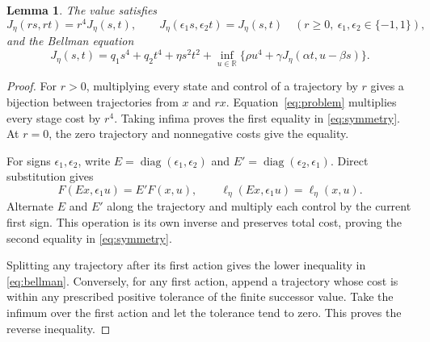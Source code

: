 \documentclass[10pt]{article}
\newtheorem{lemma}{Lemma}
\newcommand{\R}{\mathbb R}
\begin{document}
\begin{lemma}
\label{lem:symmetry}
The value satisfies
\begin{equation}
 J_\eta(rs,rt)=r^4J_\eta(s,t),\qquad
 J_\eta(\epsilon_1s,\epsilon_2t)=J_\eta(s,t)
 \quad(r\geq0,\ \epsilon_1,\epsilon_2\in\{-1,1\}),
 \label{eq:symmetry}
\end{equation}
and the Bellman equation
\begin{equation}
 J_\eta(s,t)=q_1s^4+q_2t^4+\eta s^2t^2+
 \inf_{u\in\R}\{\rho u^4+\gamma J_\eta(\alpha t,u-\beta s)\}.
 \label{eq:bellman}
\end{equation}
\end{lemma}
\begin{proof}
For $r>0$, multiplying every state and control of a trajectory by $r$ gives a bijection between trajectories from $x$ and $rx$. Equation~\eqref{eq:problem} multiplies every stage cost by $r^4$. Taking infima proves the first equality in \eqref{eq:symmetry}. At $r=0$, the zero trajectory and nonnegative costs give the equality.

For signs $\epsilon_1,\epsilon_2$, write $E=\operatorname{diag}(\epsilon_1,\epsilon_2)$ and $E'=\operatorname{diag}(\epsilon_2,\epsilon_1)$. Direct substitution gives
\[
 F(Ex,\epsilon_1u)=E'F(x,u),\qquad
 \ell_\eta(Ex,\epsilon_1u)=\ell_\eta(x,u).
\]
Alternate $E$ and $E'$ along the trajectory and multiply each control by the current first sign. This operation is its own inverse and preserves total cost, proving the second equality in \eqref{eq:symmetry}.

Splitting any trajectory after its first action gives the lower inequality in \eqref{eq:bellman}. Conversely, for any first action, append a trajectory whose cost is within any prescribed positive tolerance of the finite successor value. Take the infimum over the first action and let the tolerance tend to zero. This proves the reverse inequality.
\end{proof}
\end{document}

